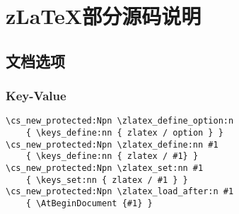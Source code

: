 \chapter{z\LaTeX{}部分源码说明}
\section{文档选项}
\subsection{Key-Value}
\begin{verbatim}
\cs_new_protected:Npn \zlatex_define_option:n
    { \keys_define:nn { zlatex / option } }
\cs_new_protected:Npn \zlatex_define:nn #1
    { \keys_define:nn { zlatex / #1} }
\cs_new_protected:Npn \zlatex_set:nn #1
    { \keys_set:nn { zlatex / #1 } }
\cs_new_protected:Npn \zlatex_load_after:n #1
    { \AtBeginDocument {#1} }
\end{verbatim}

